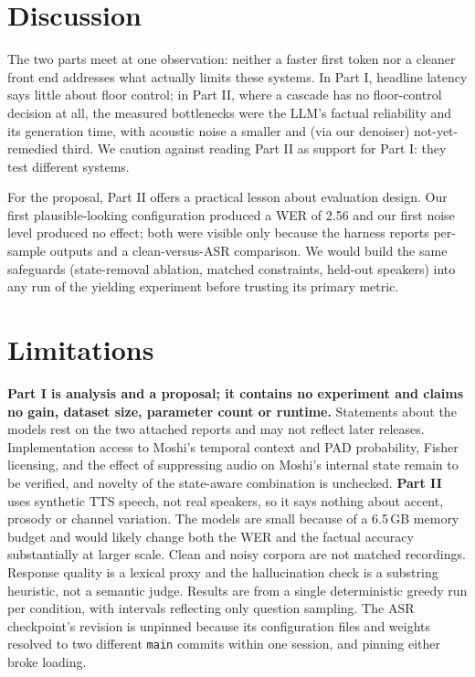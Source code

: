 \documentclass[11pt,a4paper,twocolumn]{article}
\begin{document}
\section{Discussion}

The two parts meet at one observation: neither a faster first token nor a cleaner front end addresses what actually limits these systems. In Part I, headline latency says little about floor control; in Part II, where a cascade has no floor-control decision at all, the measured bottlenecks were the LLM's factual reliability and its generation time, with acoustic noise a smaller and (via our denoiser) not-yet-remedied third. We caution against reading Part II as support for Part I: they test different systems.

For the proposal, Part II offers a practical lesson about evaluation design. Our first plausible-looking configuration produced a WER of 2.56 and our first noise level produced no effect; both were visible only because the harness reports per-sample outputs and a clean-versus-ASR comparison. We would build the same safeguards (state-removal ablation, matched constraints, held-out speakers) into any run of the yielding experiment before trusting its primary metric.

\section*{Limitations}

\textbf{Part I is analysis and a proposal; it contains no experiment and claims no gain, dataset size, parameter count or runtime.} Statements about the models rest on the two attached reports and may not reflect later releases. Implementation access to Moshi's temporal context and PAD probability, Fisher licensing, and the effect of suppressing audio on Moshi's internal state remain to be verified, and novelty of the state-aware combination is unchecked.
\textbf{Part II} uses synthetic TTS speech, not real speakers, so it says nothing about accent, prosody or channel variation. The models are small because of a 6.5\,GB memory budget and would likely change both the WER and the factual accuracy substantially at larger scale. Clean and noisy corpora are not matched recordings. Response quality is a lexical proxy and the hallucination check is a substring heuristic, not a semantic judge. Results are from a single deterministic greedy run per condition, with intervals reflecting only question sampling. The ASR checkpoint's revision is unpinned because its configuration files and weights resolved to two different \texttt{main} commits within one session, and pinning either broke loading.
\end{document}
